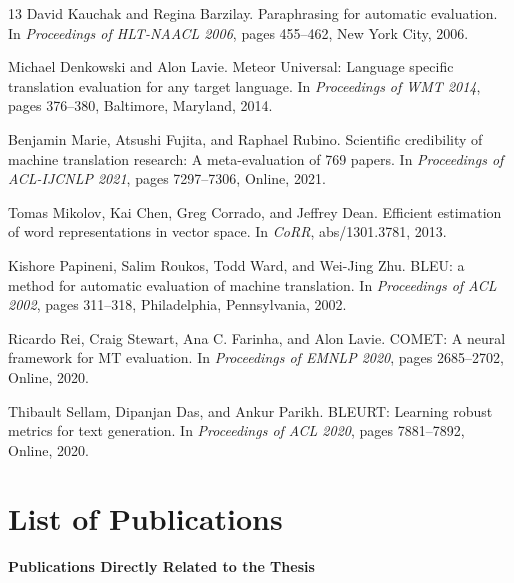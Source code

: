 \documentclass[12pt,a4paper]{report}
\newcommand{\bleu}{\textsc{BLEU}\xspace}
\newcommand{\comet}{\textsc{COMET}\xspace}
\newcommand{\bleurt}{\textsc{BLEURT}\xspace}
\newcommand{\chapwithtoc}[1]{\chapter*{#1}\addcontentsline{toc}{chapter}{#1}}
\begin{document}
\begin{thebibliography}{13}
David Kauchak and Regina Barzilay.
\newblock Paraphrasing for automatic evaluation.
\newblock In \emph{Proceedings of HLT-NAACL 2006}, pages 455--462, New York City, 2006.

Michael Denkowski and Alon Lavie.
\newblock Meteor Universal: Language specific translation evaluation for any target language.
\newblock In \emph{Proceedings of WMT 2014}, pages 376--380, Baltimore, Maryland, 2014.

Benjamin Marie, Atsushi Fujita, and Raphael Rubino.
\newblock Scientific credibility of machine translation research: A meta-evaluation of 769 papers.
\newblock In \emph{Proceedings of ACL-IJCNLP 2021}, pages 7297--7306, Online, 2021.

Tomas Mikolov, Kai Chen, Greg Corrado, and Jeffrey Dean.
\newblock Efficient estimation of word representations in vector space.
\newblock In \emph{CoRR}, abs/1301.3781, 2013.

Kishore Papineni, Salim Roukos, Todd Ward, and Wei-Jing Zhu.
\newblock \bleu: a method for automatic evaluation of machine translation.
\newblock In \emph{Proceedings of ACL 2002}, pages 311--318, Philadelphia, Pennsylvania, 2002.

Ricardo Rei, Craig Stewart, Ana C. Farinha, and Alon Lavie.
\newblock \comet: A neural framework for MT evaluation.
\newblock In \emph{Proceedings of EMNLP 2020}, pages 2685--2702, Online, 2020.

Thibault Sellam, Dipanjan Das, and Ankur Parikh.
\newblock \bleurt: Learning robust metrics for text generation.
\newblock In \emph{Proceedings of ACL 2020}, pages 7881--7892, Online, 2020.

\end{thebibliography}

\chapwithtoc{List of Publications}
\begingroup
\small
\setlength{\parskip}{0pt}

\textbf{Publications Directly Related to the Thesis}
\end{document}

